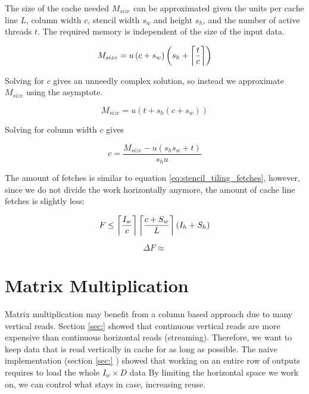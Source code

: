 The size of the cache needed $M_{size}$ can be approximated given the units per cache line $L$, column width $c$, stencil width $s_{w}$ and height $s_{h}$, and the number of active threads $t$. The required memory is independent of the size of the input data.

\[
    M_{size} = u \left(c + s_w\right) \left(s_h + \left\lceil \frac{t}{c} \right\rceil\right)
\]

Solving for $c$ gives an unneedly complex solution, so instead we approximate $M_{size}$ using the asymptote.

\[
    M_{size} = u \left(t + s_h \left(c + s_w\right)\right)
\]

Solving for column width $c$ gives 

\[
    c = \frac{M_{size} - u (s_h s_w + t)}{s_h u}
\]

The amount of fetches is similar to equation \ref{eq:stencil_tiling_fetches}, however, since we do not divide the work horizontally anymore, the amount of cache line fetches is slightly less:

\begin{equation}
    F \leq \left\lceil \frac{I_w}{c} \right\rceil\left\lceil \frac{c + S_w}{L} \right\rceil (I_h + S_h)
    \label{eq:stencil_column_fetches}
\end{equation}

\begin{equation}
    \Delta F \approx  
\end{equation}


\section{Matrix Multiplication}
Matrix multiplication may benefit from a column based approach due to many vertical reads.
Section \ref{sec:}  showed that continuous vertical reads are more expensive than continuous horizontal reads (streaming).
Therefore, we want to keep data that is read vertically in cache for as long as possible.
The naive implementation (section \ref{sec:} ) showed that working on an entire row of outputs requires to load the whole $I_w \times D$ data
By limiting the horizontal space we work on, we can control what stays in case, increasing reuse.

